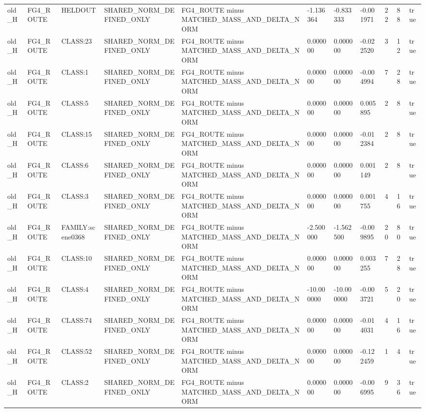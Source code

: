 \begin{tabular}{lllllllllll}
old\_H & FG4\_ROUTE & HELDOUT & SHARED\_NORM\_DEFINED\_ONLY & FG4\_ROUTE minus MATCHED\_MASS\_AND\_DELTA\_NORM & -1.136364 & -0.833333 & -0.001971 & 22 & 88 & true \\
old\_H & FG4\_ROUTE & CLASS:23 & SHARED\_NORM\_DEFINED\_ONLY & FG4\_ROUTE minus MATCHED\_MASS\_AND\_DELTA\_NORM & 0.000000 & 0.000000 & -0.022520 & 3 & 12 & true \\
old\_H & FG4\_ROUTE & CLASS:1 & SHARED\_NORM\_DEFINED\_ONLY & FG4\_ROUTE minus MATCHED\_MASS\_AND\_DELTA\_NORM & 0.000000 & 0.000000 & -0.004994 & 7 & 28 & true \\
old\_H & FG4\_ROUTE & CLASS:5 & SHARED\_NORM\_DEFINED\_ONLY & FG4\_ROUTE minus MATCHED\_MASS\_AND\_DELTA\_NORM & 0.000000 & 0.000000 & 0.005895 & 2 & 8 & true \\
old\_H & FG4\_ROUTE & CLASS:15 & SHARED\_NORM\_DEFINED\_ONLY & FG4\_ROUTE minus MATCHED\_MASS\_AND\_DELTA\_NORM & 0.000000 & 0.000000 & -0.012384 & 2 & 8 & true \\
old\_H & FG4\_ROUTE & CLASS:6 & SHARED\_NORM\_DEFINED\_ONLY & FG4\_ROUTE minus MATCHED\_MASS\_AND\_DELTA\_NORM & 0.000000 & 0.000000 & 0.001149 & 2 & 8 & true \\
old\_H & FG4\_ROUTE & CLASS:3 & SHARED\_NORM\_DEFINED\_ONLY & FG4\_ROUTE minus MATCHED\_MASS\_AND\_DELTA\_NORM & 0.000000 & 0.000000 & 0.001755 & 4 & 16 & true \\
old\_H & FG4\_ROUTE & FAMILY:scene0368 & SHARED\_NORM\_DEFINED\_ONLY & FG4\_ROUTE minus MATCHED\_MASS\_AND\_DELTA\_NORM & -2.500000 & -1.562500 & -0.009895 & 20 & 80 & true \\
old\_H & FG4\_ROUTE & CLASS:10 & SHARED\_NORM\_DEFINED\_ONLY & FG4\_ROUTE minus MATCHED\_MASS\_AND\_DELTA\_NORM & 0.000000 & 0.000000 & 0.003255 & 7 & 28 & true \\
old\_H & FG4\_ROUTE & CLASS:4 & SHARED\_NORM\_DEFINED\_ONLY & FG4\_ROUTE minus MATCHED\_MASS\_AND\_DELTA\_NORM & -10.000000 & -10.000000 & -0.003721 & 5 & 20 & true \\
old\_H & FG4\_ROUTE & CLASS:74 & SHARED\_NORM\_DEFINED\_ONLY & FG4\_ROUTE minus MATCHED\_MASS\_AND\_DELTA\_NORM & 0.000000 & 0.000000 & -0.014031 & 4 & 16 & true \\
old\_H & FG4\_ROUTE & CLASS:52 & SHARED\_NORM\_DEFINED\_ONLY & FG4\_ROUTE minus MATCHED\_MASS\_AND\_DELTA\_NORM & 0.000000 & 0.000000 & -0.122459 & 1 & 4 & true \\
old\_H & FG4\_ROUTE & CLASS:2 & SHARED\_NORM\_DEFINED\_ONLY & FG4\_ROUTE minus MATCHED\_MASS\_AND\_DELTA\_NORM & 0.000000 & 0.000000 & -0.006995 & 9 & 36 & true \\

\end{tabular}
